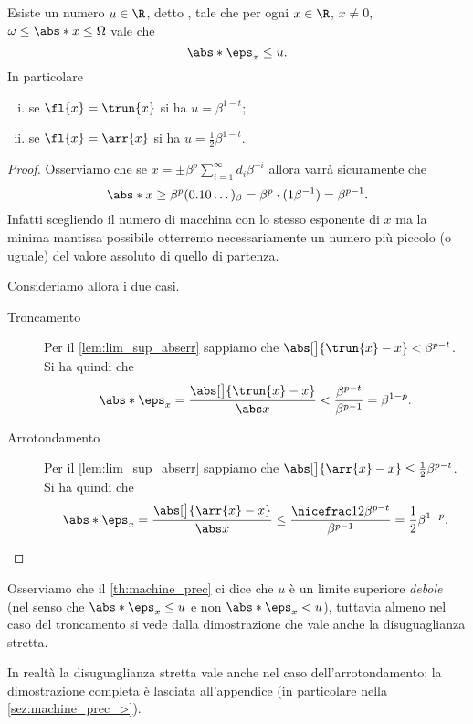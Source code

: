 \begin{theorem}
    \label{th:machine_prec}
    Esiste un numero $u \in \R$, detto , tale che per ogni $x \in \R$, $x \neq 0$, $\omega \leq \abs*{x}\leq \Omega$ vale che \[
        \abs*{\eps_x} \leq u.
    \] In particolare \begin{enumerate}[(i)]
        \item se $\fl{x} = \trun{x}$ si ha $u = \beta^{1-t}$;
        \item se $\fl{x} = \arr{x}$ si ha $u = \frac12\beta^{1-t}$. 
    \end{enumerate}
\end{theorem}
\begin{proof}
    Osserviamo che se $x = \pm\beta^p \sum_{i=1}^\infty d_i\beta^{-i}$ allora varrà sicuramente che \[
        \abs*{x} \geq \beta^p (0.10\dots)_\beta = \beta^p \cdot (1 \beta^{-1}) = \beta^{p-1}.
    \] Infatti scegliendo il numero di macchina con lo stesso esponente di $x$ ma la minima mantissa possibile otterremo necessariamente un numero più piccolo (o uguale) del valore assoluto di quello di partenza.

    Consideriamo allora i due casi.
    \begin{description}
        \item[Troncamento] Per il \autoref{lem:lim_sup_abserr} sappiamo che $\abs[\big]{\trun{x} - x} < \beta^{p-t}$. Si ha quindi che \[
                \abs*{\eps_x} 
            = \frac{\abs[\big]{\trun{x} - x}}{\abs x} 
            < \frac{\beta^{p-t}}{\beta^{p-1}}
            = \beta^{1-p}.
        \] 
        \item[Arrotondamento] Per il \autoref{lem:lim_sup_abserr} sappiamo che $\abs[\big]{\arr{x} - x} \leq \frac12\beta^{p-t}$. Si ha quindi che \[
                 \abs*{\eps_x} 
            =    \frac{\abs[\big]{\arr{x} - x}}{\abs x} 
            \leq \frac{\nicefrac12\beta^{p-t}}{\beta^{p-1}}
            =    \frac12\beta^{1-p}. \qedhere
        \]
    \end{description}
\end{proof}

Osserviamo che il \autoref{th:machine_prec} ci dice che $u$ è un limite superiore \emph{debole} (nel senso che $\abs*{\eps_x} \leq u$ e non $\abs*{\eps_x} < u$), tuttavia almeno nel caso del troncamento si vede dalla dimostrazione che vale anche la disuguaglianza stretta. 

In realtà la disuguaglianza stretta vale anche nel caso dell'arrotondamento: la dimostrazione completa è lasciata all'appendice (in particolare nella \autoref{sez:machine_prec_>}).
 